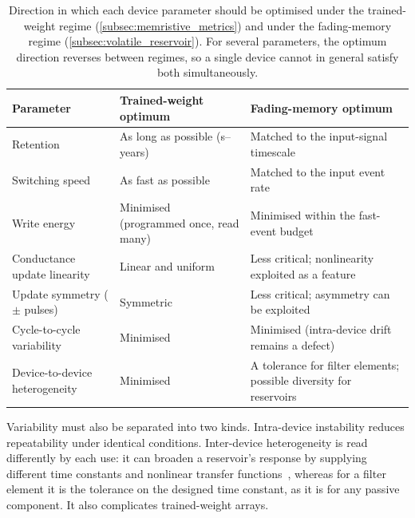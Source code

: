 \documentclass[12pt, twoside]{report}
\begin{document}
\begin{table}
  \centering
  \caption[Parameter-optimisation directions for the two device regimes]{Direction in which each device parameter should be optimised under the trained-weight regime (\cref{subsec:memristive_metrics}) and under the fading-memory regime (\cref{subsec:volatile_reservoir}). For several parameters, the optimum direction reverses between regimes, so a single device cannot in general satisfy both simultaneously.}\label{tab:param_optima}
  \begin{tabularx}{\linewidth}{l >{\raggedright\arraybackslash}X >{\raggedright\arraybackslash}X}
    \toprule
    \textbf{Parameter} & \textbf{Trained-weight optimum} & \textbf{Fading-memory optimum} \\
    \midrule
    Retention                       & As long as possible (s--years)             & Matched to the input-signal timescale \\
    Switching speed                 & As fast as possible                        & Matched to the input event rate \\
    Write energy                    & Minimised (programmed once, read many)     & Minimised within the fast-event budget \\
    Conductance update linearity    & Linear and uniform                         & Less critical; nonlinearity exploited as a feature \\
    Update symmetry (\(\pm\) pulses)& Symmetric                                  & Less critical; asymmetry can be exploited \\
    Cycle-to-cycle variability      & Minimised                                  & Minimised (intra-device drift remains a defect) \\
    Device-to-device heterogeneity  & Minimised                                  & A tolerance for filter elements; possible diversity for reservoirs~\cite{Tanaka2019} \\
    \bottomrule
  \end{tabularx}
\end{table}

Variability must also be separated into two kinds. Intra-device instability reduces repeatability under identical conditions. Inter-device heterogeneity is read differently by each use: it can broaden a reservoir's response by supplying different time constants and nonlinear transfer functions~\cite{Tanaka2019}, whereas for a filter element it is the tolerance on the designed time constant, as it is for any passive component. It also complicates trained-weight arrays.
\end{document}
